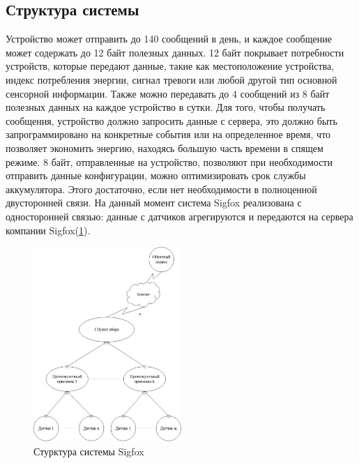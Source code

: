 \subsection{Структура системы}
Устройство может отправить до 140 сообщений в день, и каждое сообщение может содержать до 12 байт полезных данных. 12 байт покрывает потребности устройств, которые передают данные, такие как местоположение устройства, индекс потребления энергии, сигнал тревоги или любой другой тип основной сенсорной информации. 
Также можно передавать до 4 сообщений из 8 байт полезных данных на каждое устройство в сутки. Для того, чтобы получать сообщения, устройство должно запросить данные с сервера, это должно быть запрограммировано на конкретные события или на определенное время, что позволяет экономить энергию, находясь большую часть времени в спящем режиме. 8 байт, отправленные на устройство, позволяют при необходимости отправить данные конфигурации, можно оптимизировать срок службы аккумулятора. Этого достаточно, если нет необходимости в полноценной двусторонней связи. На данный момент система Sigfox реализована с односторонней связью: данные с датчиков агрегируются и передаются на сервера компании Sigfox(\ref{fig:img11}). 
\begin{figure}[H]
	\centering
	\includegraphics[width=0.5\textwidth]{img/kich_bur/11.pdf}
	\caption{Стурктура системы Sigfox}
	\label{fig:img11}
\end{figure}
